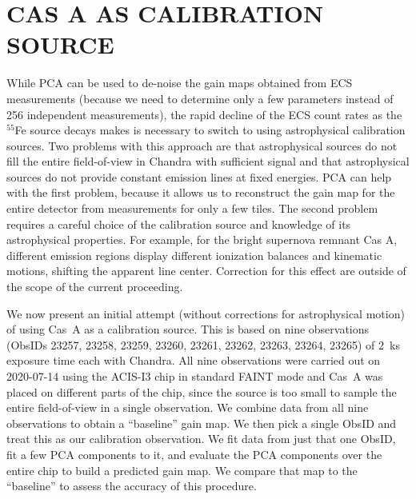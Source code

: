 \documentclass[]{spie}  %
\begin{document}
\section{CAS A AS CALIBRATION SOURCE}
While PCA can be used to de-noise the gain maps obtained from ECS measurements (because we need to determine only a few parameters instead of 256 independent measurements), the rapid decline of the ECS count rates as the $^{55}$Fe source decays makes is necessary to switch to using astrophysical calibration sources. Two problems with this approach are that astrophysical sources do not fill the entire field-of-view in Chandra with sufficient signal and that astrophysical sources do not provide constant emission lines at fixed energies. PCA can help with the first problem, because it allows us to reconstruct the gain map for the entire detector from measurements for only a few tiles. The second problem requires a careful choice of the calibration source and knowledge of its astrophysical properties. For example, for the bright supernova remnant Cas A, different emission regions display different ionization balances and kinematic motions, shifting the apparent line center\cite{2010ApJ...725.2038D,2012ApJ...746..130H}. Correction for this effect are outside of the scope of the current proceeding.

We now present an initial attempt (without corrections for astrophysical motion) of using Cas~A as a calibration source.
This is based on nine observations (ObsIDs 23257, 23258, 23259, 23260, 23261, 23262, 23263, 23264, 23265) of 2~ks exposure time each with Chandra. All nine observations were carried out on 2020-07-14 using the ACIS-I3 chip in standard FAINT mode and Cas~A was placed on different parts of the chip, since the source is too small to sample the entire field-of-view in a single observation. We combine data from all nine observations to obtain a ``baseline'' gain map. We then pick a single ObsID and treat this as our calibration observation. We fit data from just that one ObsID, fit a few PCA components to it, and evaluate the PCA components over the entire chip to build a predicted gain map. We compare that map to the ``baseline'' to assess the accuracy of this procedure.
\end{document}
